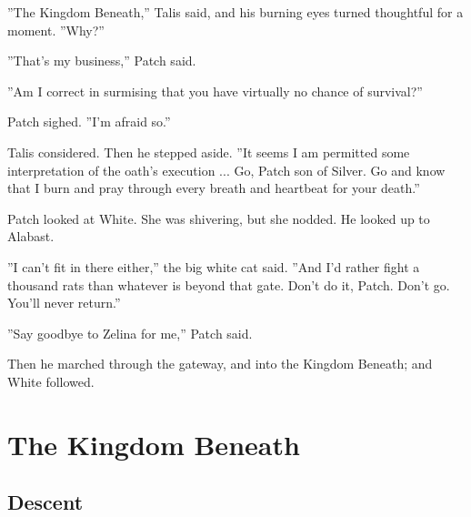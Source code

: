 \documentclass[12pt]{book}
\begin{document}
 ''The Kingdom Beneath,'' Talis said, and his burning eyes turned thoughtful for a moment. ''Why?''\par
 ''That's my business,'' Patch said.\par
 ''Am I correct in surmising that you have virtually no chance of survival?''\par
 Patch sighed. ''I'm afraid so.''\par
 Talis considered. Then he stepped aside. ''It seems I am permitted some interpretation of the oath's execution ... Go, Patch son of Silver. Go and know that I burn and pray through every breath and heartbeat for your death.''\par
 Patch looked at White. She was shivering, but she nodded. He looked up to Alabast.\par
 ''I can't fit in there either,'' the big white cat said. ''And I'd rather fight a thousand rats than whatever is beyond that gate. Don't do it, Patch. Don't go. You'll never return.''\par
 ''Say goodbye to Zelina for me,'' Patch said.\par
 Then he marched through the gateway, and into the Kingdom Beneath; and White followed.\par

\chapter{The Kingdom Beneath}

\section{Descent}
\end{document}
